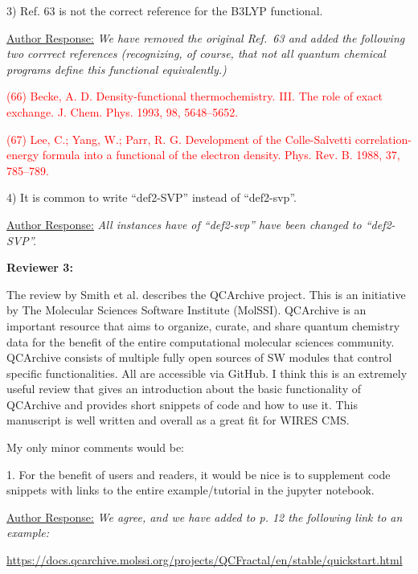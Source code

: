 \documentclass[12pt]{article}
\begin{document}
3) Ref. 63 is not the correct reference for the B3LYP functional. 

\noindent
\underline{Author Response:} \textit{We have removed the original Ref.\ 63 and
added the following two corrrect references (recognizing, of course, that not
all quantum chemical programs define this functional equivalently.)}

\noindent
\textcolor{red}{(66) Becke, A. D. Density-functional thermochemistry. III. The
role of exact exchange. J. Chem. Phys. 1993, 98, 5648–5652.}

\noindent
\textcolor{red}{(67) Lee, C.; Yang, W.; Parr, R. G. Development of the Colle-Salvetti
correlation-energy formula into a functional of the electron density. Phys. Rev.
B. 1988, 37, 785–789.}

4) It is common to write ``def2-SVP'' instead of ``def2-svp''.

\noindent \underline{Author Response:} \textit{All instances have of
``def2-svp'' have been changed to ``def2-SVP''.}

\noindent\makebox[\linewidth]{\rule{\linewidth}{0.4pt}}

\noindent
\textbf{Reviewer 3:}

\noindent The review by Smith et al. describes the QCArchive project. This is
an initiative by The Molecular Sciences Software Institute (MolSSI). QCArchive
is an important resource that aims to organize, curate, and share quantum
chemistry data for the benefit of the entire computational molecular sciences
community.  QCArchive consists of multiple fully open sources of SW modules
that control specific functionalities. All are accessible via GitHub. I think
this is an extremely useful review that gives an introduction about the basic
functionality of QCArchive and provides short snippets of code and how to use
it. This manuscript is well written and overall as a great fit for WIRES CMS.

My only minor comments would be:

1.	For the benefit of users and readers, it would be nice is to supplement code snippets with links to the entire example/tutorial in the jupyter notebook.

\noindent
\underline{Author Response:} \textit{We agree, and we have added to p. 12 the 
following link to an example:}

\begin{center}
\url{https://docs.qcarchive.molssi.org/projects/QCFractal/en/stable/quickstart.html}
\end{center}
\end{document}

